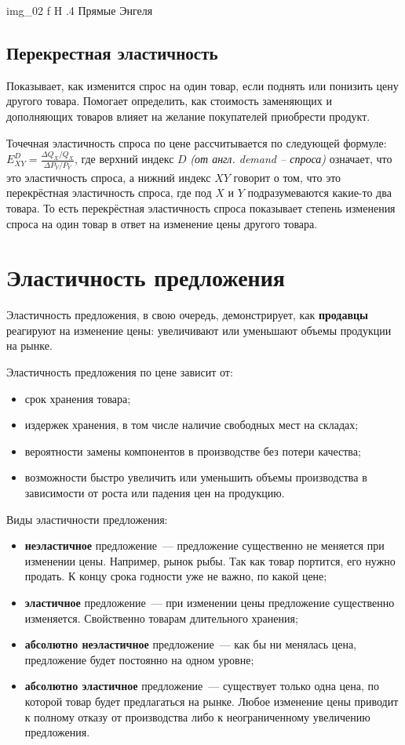 {img_02}
{f}
{H}
{.4\textwidth}
{Прямые Энгеля~\cite{elast2}}

\subsection{Перекрестная эластичность}
Показывает, как изменится спрос на один товар, если поднять или понизить цену другого товара. 
Помогает определить, как стоимость заменяющих и дополняющих товаров влияет на желание покупателей приобрести продукт.

Точечная эластичность спроса по цене рассчитывается по следующей формуле: $E_{XY}^{D}=\frac{\Delta Q_{X}/Q_{X}}{\Delta P_{Y}/P_{Y}}$,
где верхний индекс $D$ \textit{(от англ. demand -- спроса)} означает, что это эластичность спроса, а нижний индекс $XY$ говорит о том, что это перекрёстная эластичность спроса, где под $X$ и $Y$ подразумеваются какие-то два товара. 
То есть перекрёстная эластичность спроса показывает степень изменения спроса на один товар  в ответ на изменение цены другого товара.

\section{Эластичность предложения}

Эластичность предложения, в свою очередь, демонстрирует, как \textbf{продавцы} реагируют на изменение цены: увеличивают или уменьшают объемы продукции на рынке. 

Эластичность предложения по цене зависит от:
\begin{itemize}
	\item срок хранения товара;
	\item издержек хранения, в том числе наличие свободных мест на складах;
	\item вероятности замены компонентов в производстве без потери качества;
	\item возможности быстро увеличить или уменьшить объемы производства в зависимости от роста или падения цен на продукцию.
\end{itemize}

Виды эластичности предложения:
\begin{itemize}
	\item \textbf{неэластичное} предложение~--- предложение существенно не меняется при изменении цены. Например, рынок рыбы. 
	Так как товар портится, его нужно продать. 
	К концу срока годности уже не важно, по какой цене;
	\item \textbf{эластичное} предложение~--- при изменении цены предложение существенно изменяется. 
	Свойственно товарам длительного хранения;
	\item \textbf{абсолютно неэластичное} предложение~--- как бы ни менялась цена, предложение будет постоянно на одном уровне;
	\item \textbf{абсолютно эластичное} предложение~--- существует только одна цена, по которой товар будет предлагаться на рынке. 
	Любое изменение цены приводит к полному отказу от производства либо к неограниченному увеличению предложения.
\end{itemize}

